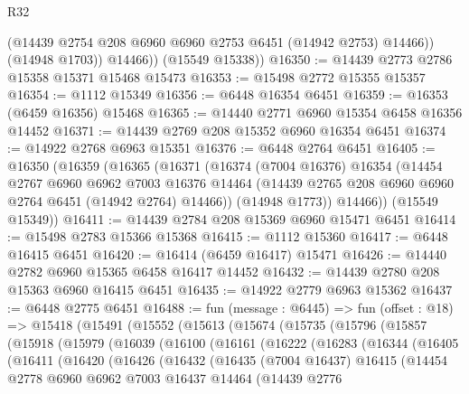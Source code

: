 \begin{lexlean}{R32}
\begin{coremodule}
              (@14439 @2754 @208 @6960 @6960 @2753 @6451 (@14942 @2753) @14466))
            (@14948 @1703))
          @14466))
      (@15549 @15338))
@16350 := @14439 @2773 @2786 @15358 @15371 @15468 @15473
@16353 := @15498 @2772 @15355 @15357
@16354 := @1112 @15349
@16356 := @6448 @16354 @6451
@16359 := @16353 (@6459 @16356) @15468
@16365 := @14440 @2771 @6960 @15354 @6458 @16356 @14452
@16371 := @14439 @2769 @208 @15352 @6960 @16354 @6451
@16374 := @14922 @2768 @6963 @15351
@16376 := @6448 @2764 @6451
@16405 := @16350
    (@16359
      (@16365
        (@16371
          (@16374
            (@7004 @16376)
            @16354
            (@14454
              @2767
              @6960
              @6962
              @7003
              @16376
              @14464
              (@14439 @2765 @208 @6960 @6960 @2764 @6451 (@14942 @2764) @14466))
            (@14948 @1773))
          @14466))
      (@15549 @15349))
@16411 := @14439 @2784 @208 @15369 @6960 @15471 @6451
@16414 := @15498 @2783 @15366 @15368
@16415 := @1112 @15360
@16417 := @6448 @16415 @6451
@16420 := @16414 (@6459 @16417) @15471
@16426 := @14440 @2782 @6960 @15365 @6458 @16417 @14452
@16432 := @14439 @2780 @208 @15363 @6960 @16415 @6451
@16435 := @14922 @2779 @6963 @15362
@16437 := @6448 @2775 @6451
@16488 := fun (message : @6445) =>
  fun (offset : @18) =>
  @15418
    (@15491
      (@15552
        (@15613
          (@15674
            (@15735
              (@15796
                (@15857
                  (@15918
                    (@15979
                      (@16039
                        (@16100
                          (@16161
                            (@16222
                              (@16283
                                (@16344
                                  (@16405
                                    (@16411
                                      (@16420
                                        (@16426
                                          (@16432
                                            (@16435
                                              (@7004 @16437)
                                              @16415
                                              (@14454
                                                @2778
                                                @6960
                                                @6962
                                                @7003
                                                @16437
                                                @14464
                                                (@14439
                                                  @2776

\end{coremodule}
\end{lexlean}
